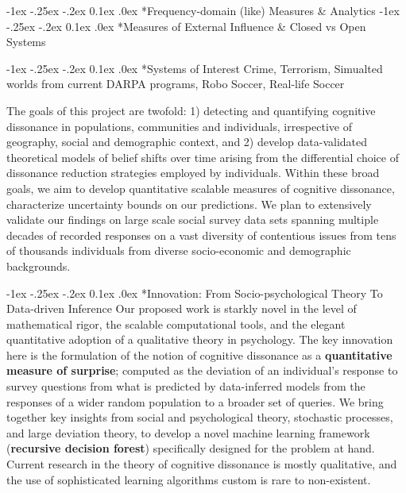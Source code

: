 \documentclass[onecolumn, compsoc,11pt]{IEEEtran}
\makeatletter
\renewcommand\subsection{\@startsection {section}{1}{\z@}%
  {-1ex \@plus -.25ex \@minus -.2ex}%
  {0.1ex \@plus.0ex}%
  {\fontsize{11}{10}\selectfont\bfseries\sffamily\color{DodgerBlue4}}}
\makeatother
\begin{document}
\subsection*{Frequency-domain (like)  Measures \& Analytics}
\subsection*{Measures  of External Influence \& Closed vs Open Systems}


\subsection*{Systems of Interest} Crime, Terrorism, Simualted worlds from current DARPA programs, Robo Soccer, Real-life Soccer

The goals of this project are twofold: 1) detecting and quantifying cognitive dissonance in populations, communities and individuals, irrespective of geography, social and demographic context, and 2) develop data-validated theoretical models of belief shifts over time arising from the differential choice of dissonance reduction strategies employed by individuals. Within these broad goals, we aim to develop quantitative scalable  measures of cognitive dissonance, characterize uncertainty bounds on our predictions. We plan to extensively validate our findings on large scale social survey data sets spanning multiple decades of recorded responses on a vast diversity of contentious issues from tens of thousands individuals from diverse socio-economic and demographic backgrounds. 

\subsection*{Innovation: From Socio-psychological Theory To Data-driven Inference}
Our proposed work is starkly novel in the level of mathematical rigor, the scalable computational tools, and the elegant quantitative adoption of a qualitative theory in psychology. The key innovation here  is the formulation of the notion of cognitive dissonance as a \textbf{quantitative  measure of surprise}; computed as the deviation of an individual's response to
survey questions from what is predicted by data-inferred models from the  responses of a wider random population  to a broader set of queries. We bring together key insights from social and psychological theory, stochastic processes, and large deviation theory, to develop a novel machine learning framework (\textbf{recursive decision forest}) specifically designed for the problem at hand. Current research in the theory of cognitive dissonance is mostly qualitative, and the use of sophisticated learning algorithms custom is rare to non-existent. 
\end{document}
